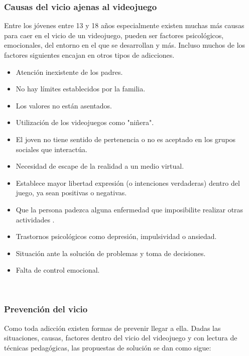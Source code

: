 \subsubsection{Causas del vicio ajenas al videojuego }
Entre los jóvenes entre 13 y 18 años especialmente existen muchas más causas para caer en el vicio de un videojuego, pueden ser factores psicológicos, emocionales, del entorno en el que se desarrollan y más. Incluso muchos de los factores siguientes encajan en otros tipos de adicciones.
\begin{itemize}
	\item Atención inexistente de los padres.
	\item No hay límites establecidos por la familia.
	\item Los valores no están asentados.
	\item Utilización de los videojuegos como "niñera".
	\item El joven no tiene sentido de pertenencia o no es aceptado en los grupos sociales que interactúa.
	\item Necesidad de escape de la realidad a un medio virtual.
	\item Establece mayor libertad expresión (o intenciones verdaderas) dentro del juego, ya sean positivas o negativas.
	\item Que la persona padezca alguna enfermedad que imposibilite realizar otras actividades .
	\item Trastornos psicológicos como depresión, impulsividad o ansiedad.
	\item Situación ante la solución de problemas y toma de decisiones.
	\item Falta de control emocional.
\end{itemize}
\\[1pt]

\subsubsection{Prevención del vicio}
Como toda adicción existen formas de prevenir llegar a ella.
Dadas las situaciones, causas, factores dentro del vicio del videojuego y con lectura de técnicas pedagógicas, las propuestas de solución se dan como sigue:

